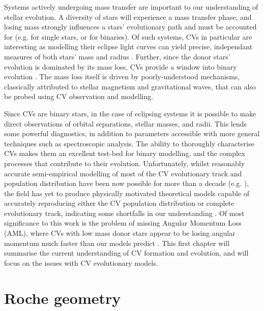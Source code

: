 Systems actively undergoing mass transfer are important to our understanding of stellar evolution. A diversity of stars will experience a mass transfer phase, and losing mass strongly influences a stars' evolutionary path and must be accounted for (e.g. \citealt{renzini1981, smith2014} for single stars, or \citealt{hurley2002} for binaries). Of such systems, CVs in particular are interesting as modelling their eclipse light curves can yield precise, independant measures of both stars' mass and radius \citep{wood1986,Littlefair2008,Savoury2011}. Further, since the donor stars' evolution is dominated by its mass loss, CVs provide a window into binary evolution \citep{knigge2006}.
The mass loss itself is driven by poorly-understood mechanisms, classically attributed to stellar magnetism and gravitational waves, that can also be probed using CV observation and modelling.

Since CVs are binary stars, in the case of eclipsing systems it is possible to make direct observations of orbital separations, stellar masses, and radii. This lends some powerful diagnostics, in addition to parameters accessible with more general techniques such as spectroscopic analysis.
The ability to thoroughly characterise CVs makes them an excellent test-bed for binary modelling, and the complex processes that contribute to their evolution.
Unfortunately, whilst reasonably accurate semi-empirical modelling of most of the CV evolutionary track and population distribution have been now possible for more than a decade (e.g. \citealt{knigge11,Paxton_2015}), the field has yet to produce physically motivated theoretical models capable of accurately reproducing either the CV population distribution or complete evolutionary track, indicating some shortfalls in our understanding \citep{schreiber2015,Schreiber2016}.
Of most significance to this work is the problem of missing Angular Momentum Loss (AML), where CVs with low mass donor stars appear to be losing angular momentum much faster than our models predict \citep{Schreiber2016}. This first chapter will summarise the current understanding of CV formation and evolution, and will focus on the issues with CV evolutionary models.


\section{Roche geometry}
\label{sect:introduction:Roche geometry}

